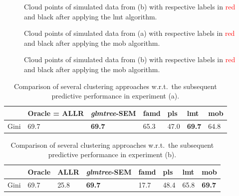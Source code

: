 \begin{figure}
\caption{Cloud points of simulated data from (b) with respective labels in \textcolor{red}{red} and black after applying the \gls{lmt} algorithm.}
\label{fig:simu_b_lmt}
\end{figure}

\begin{figure}
\centering \resizebox{.7\textwidth}{!}{}
\caption{Cloud points of simulated data from (a) with respective labels in \textcolor{red}{red} and black after applying the \gls{mob} algorithm.}
\label{fig:simu_a_mob}
\end{figure}

\begin{figure}
\centering \resizebox{.7\textwidth}{!}{}
\caption{Cloud points of simulated data from (b) with respective labels in \textcolor{red}{red} and black after applying the \gls{mob} algorithm.}
\label{fig:simu_b_mob}
\end{figure}

\begin{table}[t]
\caption{\label{tab:num_exp_tree_pas} Comparison of several clustering approaches w.r.t.\ the subsequent predictive performance in experiment (a).}
\centering
\begin{tabular}{ll|lllll}
 & Oracle = ALLR & \textit{glmtree}-SEM & \gls{famd} & \gls{pls} & \gls{lmt} & \gls{mob} \\
\hline
Gini & 69.7 & \textbf{69.7} & 65.3 & 47.0 & \textbf{69.7} & 64.8 \\
\end{tabular}
\end{table}


\begin{table}[t]
\caption{\label{tab:num_exp_tree} Comparison of several clustering approaches w.r.t.\ the subsequent predictive performance in experiment (b).}
\centering
\begin{tabular}{ll|llllll}
 & Oracle & ALLR & \textit{glmtree}-SEM & \gls{famd} & \gls{pls} & \gls{lmt} & \gls{mob} \\
\hline
Gini & 69.7 & 25.8 & \textbf{69.7} & 17.7 & 48.4 & 65.8 & \textbf{69.7} \\
\end{tabular}
\end{table}



